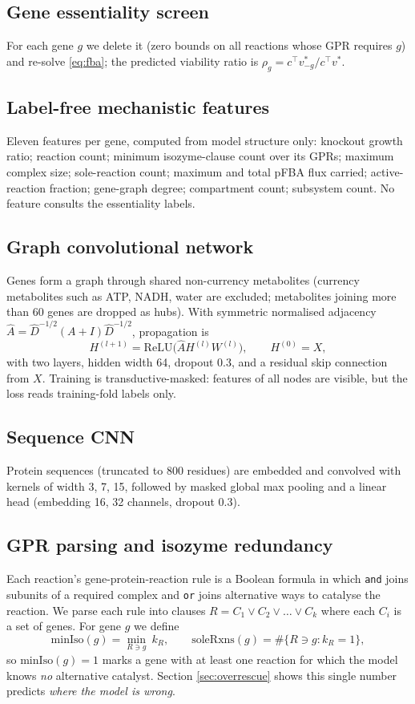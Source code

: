 \documentclass[12pt]{article}
\begin{document}
\subsection{Gene essentiality screen}
For each gene $g$ we delete it (zero bounds on all reactions whose GPR
requires $g$) and re-solve \eqref{eq:fba}; the predicted viability ratio is
$\rho_g = c^{\top}v^{*}_{-g}/c^{\top}v^{*}$.
\subsection{Label-free mechanistic features}
Eleven features per gene, computed from model structure only: knockout
growth ratio; reaction count; minimum isozyme-clause count over its GPRs;
maximum complex size; sole-reaction count; maximum and total pFBA flux
carried; active-reaction fraction; gene-graph degree; compartment count;
subsystem count. No feature consults the essentiality labels.
\subsection{Graph convolutional network}
Genes form a graph through shared non-currency metabolites (currency
metabolites such as ATP, NADH, water are excluded; metabolites joining more
than 60 genes are dropped as hubs). With symmetric normalised adjacency
$\hat{A} = \hat{D}^{-1/2}(A+I)\hat{D}^{-1/2}$, propagation is
\begin{equation}
H^{(l+1)} = \mathrm{ReLU}\!\big(\hat{A} H^{(l)} W^{(l)}\big),
\qquad H^{(0)} = X, \label{eq:gcn}
\end{equation}
with two layers, hidden width 64, dropout 0.3, and a residual skip
connection from $X$. Training is transductive-masked: features of all nodes
are visible, but the loss reads training-fold labels only.
\subsection{Sequence CNN}
Protein sequences (truncated to 800 residues) are embedded and convolved
with kernels of width 3, 7, 15, followed by masked global max pooling and a
linear head (embedding 16, 32 channels, dropout 0.3).
\subsection{GPR parsing and isozyme redundancy}
\label{sec:gpr}
Each reaction's gene-protein-reaction rule is a Boolean formula in which
\texttt{and} joins subunits of a required complex and \texttt{or} joins
alternative ways to catalyse the reaction. We parse each rule into clauses
$R = C_1 \lor C_2 \lor \dots \lor C_k$ where each $C_i$ is a set of
genes. For gene $g$ we define
\begin{equation}
\mathrm{minIso}(g) = \min_{R \ni g}\ k_R,
\qquad
\mathrm{soleRxns}(g) = \#\{R \ni g : k_R = 1\},
\label{eq:gpr}
\end{equation}
so $\mathrm{minIso}(g)=1$ marks a gene with at least one reaction for
which the model knows \emph{no} alternative catalyst. Section
\ref{sec:overrescue} shows this single number predicts \emph{where the
model is wrong}.
\end{document}
